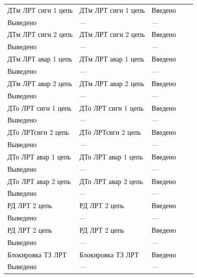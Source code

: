 \begin{longtable}{|>{\centering\arraybackslash}m{5.3cm}|>{\centering\arraybackslash}m{3.3cm}|>{\centering\arraybackslash}m{4.2cm}|>{\centering\arraybackslash}m{1.8cm}|>{\centering\arraybackslash}m{1cm}|}
\multicolumn{5}{|c|}{ ТЗ ЛРТ } \\ \hline 
\raggedright ДТм ЛРТ сигн 1 цепь & \centering ДТм ЛРТ сигн 1 цепь & \centering Введено \\ Выведено & \centering --- & \centering \arraybackslash --- \\
\hline
\raggedright ДТм ЛРТ сигн 2 цепь & \centering ДТм ЛРТ сигн 2 цепь & \centering Введено \\ Выведено & \centering --- & \centering \arraybackslash --- \\
\hline
\raggedright ДТм ЛРТ авар 1 цепь & \centering ДТм ЛРТ авар 1 цепь & \centering Введено \\ Выведено & \centering --- & \centering \arraybackslash --- \\
\hline
\raggedright ДТм ЛРТ авар 2 цепь & \centering ДТм ЛРТ авар 2 цепь & \centering Введено \\ Выведено & \centering --- & \centering \arraybackslash --- \\
\hline
\raggedright ДТо ЛРТ сигн 1 цепь & \centering ДТо ЛРТ сигн 1 цепь & \centering Введено \\ Выведено & \centering --- & \centering \arraybackslash --- \\
\hline
\raggedright ДТо ЛРТсигн 2 цепь & \centering ДТо ЛРТсигн 2 цепь & \centering Введено \\ Выведено & \centering --- & \centering \arraybackslash --- \\
\hline
\raggedright ДТо ЛРТ авар 1 цепь & \centering ДТо ЛРТ авар 1 цепь & \centering Введено \\ Выведено & \centering --- & \centering \arraybackslash --- \\
\hline
\raggedright ДТо ЛРТ авар 2 цепь & \centering ДТо ЛРТ авар 2 цепь & \centering Введено \\ Выведено & \centering --- & \centering \arraybackslash --- \\
\hline
\raggedright РД ЛРТ 2 цепь & \centering РД ЛРТ 2 цепь & \centering Введено \\ Выведено & \centering --- & \centering \arraybackslash --- \\
\hline
\raggedright РД ЛРТ 2 цепь & \centering РД ЛРТ 2 цепь & \centering Введено \\ Выведено & \centering --- & \centering \arraybackslash --- \\
\hline
\raggedright Блокировка ТЗ ЛРТ & \centering Блокировка ТЗ ЛРТ & \centering Введено \\ Выведено & \centering --- & \centering \arraybackslash --- \\

\end{longtable}
